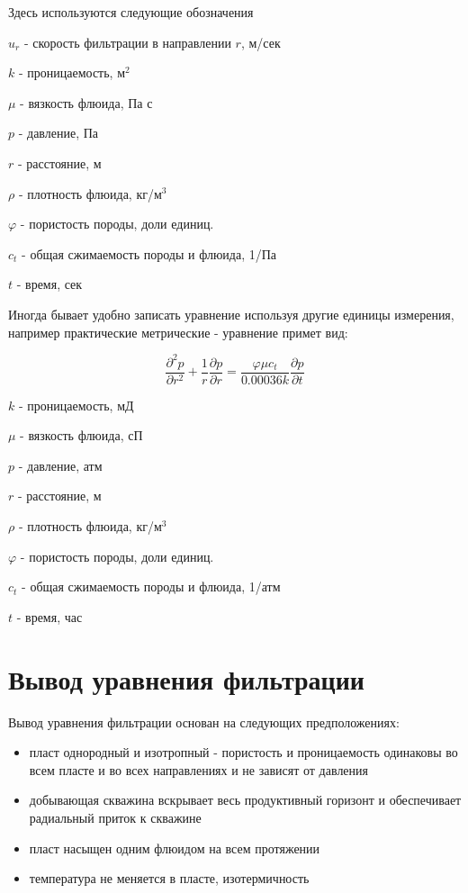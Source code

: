 Здесь используются следующие обозначения

$u_r$ - скорость фильтрации в направлении $r$, м/сек

$k$ - проницаемость, м$^2$

$\mu$ - вязкость флюида, Па с

$p$ - давление, Па 

$r$ - расстояние, м 

$\rho$ - плотность флюида, кг/м$^3$

$\varphi$ - пористость породы, доли единиц.

$c_t$ - общая сжимаемость породы и флюида, 1/Па

$t$ - время, сек

Иногда бывает удобно записать уравнение используя другие единицы измерения, например практические метрические - уравнение примет вид:

\begin{equation} \label{eq:diff_eq_2} 
	\frac{\partial ^2 p }{\partial r^2} + \frac{1}{r} \frac{\partial p}{\partial r} = \frac{\varphi \mu c_t}{0.00036 k} \frac{\partial p}{\partial t} 
\end{equation}


$k$ - проницаемость, мД

$\mu$ - вязкость флюида, сП

$p$ - давление, атм 

$r$ - расстояние, м 

$\rho$ - плотность флюида, кг/м$^3$

$\varphi$ - пористость породы, доли единиц.

$c_t$ - общая сжимаемость породы и флюида, 1/атм

$t$ - время, час

\section{Вывод уравнения фильтрации}

Вывод уравнения фильтрации основан на следующих предположениях: 
\begin{itemize}
	\item пласт однородный и изотропный - пористость и проницаемость одинаковы во всем пласте и во всех направлениях и не зависят от давления 
	\item добывающая скважина вскрывает весь продуктивный горизонт и обеспечивает радиальный приток к скважине
	\item пласт насыщен одним флюидом на всем протяжении
	\item температура не меняется в пласте, изотермичность
\end{itemize}

